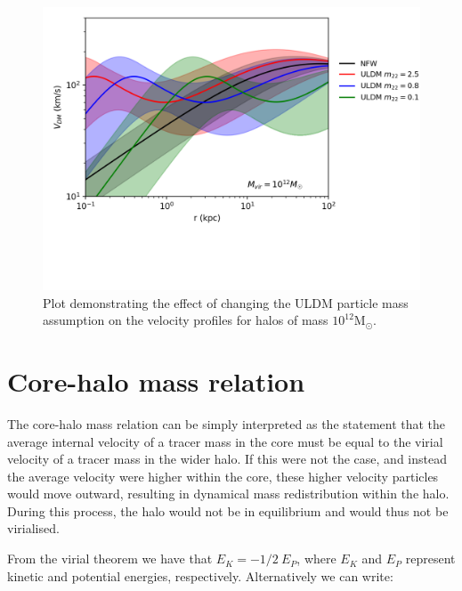 \documentclass{pasa}%
\begin{document}
\begin{appendix}

\begin{figure}[t]
\centering
\includegraphics[scale = 0.8, trim={0cm 2.5cm 1cm 0cm}]{000_comp_10_12.png} 
\caption{Plot demonstrating the effect of changing the ULDM particle mass assumption on the velocity profiles for halos of mass $10^{12}\mathrm{M}_{\odot}$.}\label{fig:vel_5_10_11}
\end{figure}

\section{Core-halo mass relation}\label{app:core-halo}

The core-halo mass relation can be simply interpreted as the statement that the average internal velocity of a tracer mass in the core must be equal to the virial velocity of a tracer mass in the wider halo. If this were not the case, and instead the average velocity were higher within the core, these higher velocity particles would move outward, resulting in dynamical mass redistribution within the halo. During this process, the halo would not be in equilibrium and would thus not be virialised.

From the virial theorem we have that $E_K=-1/2 \ E_P$, where $E_K$ and $E_P$ represent kinetic and potential energies, respectively. Alternatively we can write:


\end{appendix}
\end{document}
